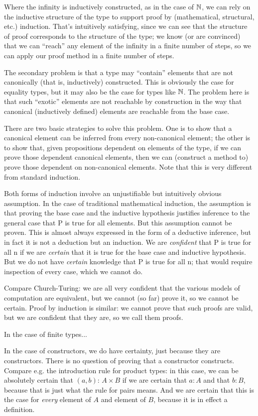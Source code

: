 \documentclass{article}
\begin{document}
  Where the infinity is inductively constructed, as in the case
of \(\mathbb{N}\), we can rely on the inductive structure of the type to
support proof by (mathematical, structural, etc.) induction.  That's
intuitively satisfying, since we can see that the structure of proof
corresponds to the structure of the type; we know (or are convinced)
that we can ``reach'' any element of the infinity in a finite number
of steps, so we can apply our proof method in a finite number of
steps.

The secondary problem is that a type may ``contain'' elements that are
not canonically (that is, inductively) constructed.  This is obviously
the case for equality types, but it may also be the case for types
like \(\mathbb{N}\).  The problem here is that such ``exotic'' elements are
not reachable by construction in the way that canonical (inductively
defined) elements are reachable from the base case.

There are two basic strategies to solve this problem.  One is to show
that a canonical element can be inferred from every non-canonical
element; the other is to show that, given propositions dependent on
elements of the type, if we can prove those dependent canonical
elements, then we can (construct a method to) prove those dependent on
non-canonical elements.  Note that this is very different from
standard induction.

Both forms of induction involve an unjustifiable but intuitively
obvious assumption.  In the case of traditional mathematical
induction, the assumption is that proving the base case and the
inductive hypothesis justifies inference to the general case that P is
true for all elements.  But this assumption cannot be proven.  This is
almost always expressed in the form of a deductive inference, but in
fact it is not a deduction but an induction.  We are \emph{confident}
that P is true for all n if we are \emph{certain} that it is true for
the base case and inductive hypothesis.  But we do not have
\emph{certain} knowledge that P is true for all n; that would require
inspection of every case, which we cannot do.

Compare Church-Turing: we are all very confident that the various
models of computation are equivalent, but we cannot (so far) prove it,
so we cannot be certain.  Proof by induction is similar: we cannot
prove that such proofs are valid, but we are confident that they are,
so we call them proofs.

In the case of finite types...

In the case of constructors, we do have certainty, just because they
are constructors.  There is no question of proving that a constructor
constructs.  Compare e.g. the introduction rule for product types: in
this case, we can be absolutely certain that \((a,b){:}\,A\times B\)
if we are certain that \(a{:}A\) and that \(b{:}B\), because that is
just what the rule for pairs means.  And we are certain that this is
the case for \emph{every} element of \(A\) and element of \(B\),
because it is in effect a definition.
\end{document}
